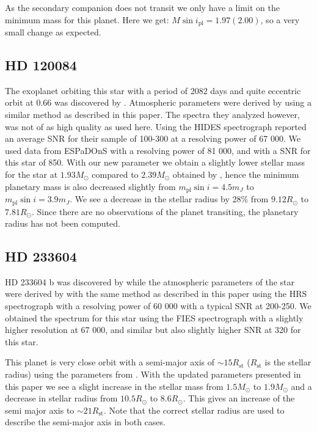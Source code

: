 \documentclass{aa}
\begin{document}
As the secondary companion does not transit we only have a limit on the minimum
mass for this planet. Here we get: $M\sin i_\mathrm{pl} = 1.97(2.00)$, so a very
small change as expected.


\subsection{HD 120084}
\label{sub:HD_120084}
The exoplanet orbiting this star with a period of 2082 days and quite eccentric
orbit at 0.66 was discovered by \citet{Sato2013}. Atmospheric parameters were
derived by \citet{Takeda2008} using a similar method as described in this paper.
The spectra they analyzed however, was not of as high quality as used here.
Using the HIDES spectrograph \citet{Takeda2008} reported an average SNR for
their sample of 100-300 at a resolving power of 67 000. We used data from
ESPaDOnS with a resolving power of 81 000, and with a SNR for this star of 850.
With our new parameter we obtain a slightly lower stellar mass for the star at
$1.93M_\odot$ compared to $2.39M_\odot$ obtained by \cite{Takeda2008}, hence the
minimum planetary mass is also decreased slightly from $m_\mathrm{pl}\sin
i=4.5m_J$ to $m_\mathrm{pl}\sin i=3.9m_J$. We see a decrease in the stellar
radius by 28\% from $9.12R_\odot$ to $7.81R_\odot$. Since there are no
observations of the planet transiting, the planetary radius has not been
computed.


\subsection{HD 233604}
\label{sub:HD_233604}
HD 233604 b was discovered by \citet{Nowak2013} while the atmospheric parameters
of the star were derived by \citet{Zielinski2012} with the same method as
described in this paper using the HRS spectrograph with a resolving power of 60
000 with a typical SNR at 200-250. We obtained the spectrum for this star using
the FIES spectrograph with a slightly higher resolution at 67 000, and similar
but also slightly higher SNR at 320 for this star.

This planet is very close orbit with a semi-major axis of $\sim 15R_\mathrm{st}$
($R_\mathrm{st}$ is the stellar radius) using the parameters from
\citet{Nowak2013}. With the updated parameters presented in this paper we see a
slight increase in the stellar mass from $1.5M_\odot$ to $1.9M_\odot$ and a
decrease in stellar radius from $10.5R_\odot$ to $8.6R_\odot$. This gives an
increase of the semi major axis to $\sim 21R_\mathrm{st}$. Note that the correct
stellar radius are used to describe the semi-major axis in both cases.
\end{document}
